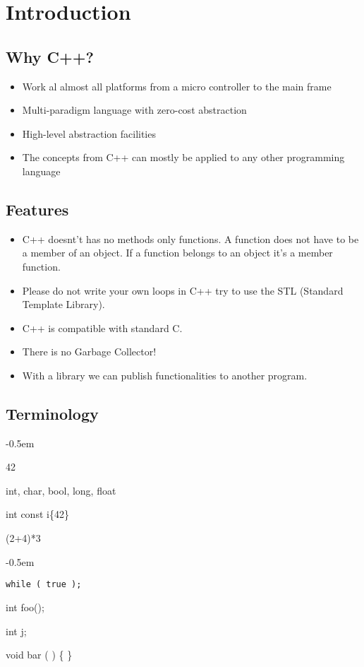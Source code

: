 \tableofcontents
\pagebreak

\section{Introduction}
\subsection{Why C++?}
\begin{itemize}
  \itemsep -0.5em 
  \item Work al almost all platforms from a micro controller to the main frame
  \item Multi-paradigm language with zero-cost abstraction
  \item High-level abstraction facilities
  \item The concepts from C++ can mostly be applied to any other programming language
\end{itemize}

\subsection{Features}
\begin{itemize}
  \itemsep -0.5em 
  \item C++ doesnt't has no methods only functions. A function does not have to be a member of an object. If a function belongs to an object it's a member function.
  \item Please do not write your own loops in C++ try to use the STL (Standard Template Library).
  \item C++ is compatible with standard C.
  \item There is no Garbage Collector!
  \item With a library we can publish functionalities to another program.
\end{itemize}

\subsection{Terminology}
\begin{minipage}{0,5\linewidth}
	\begin{description}
		\itemsep -0.5em
		\item[Value] 42
  		\item[Type] int, char, bool, long, float
  		\item[Variable] int const i\{42\}
  		\item[Expression] (2+4)*3
	\end{description}  
\end{minipage}
\begin{minipage}{0,5\linewidth}
	\begin{description}
		\itemsep -0.5em
   		\item[Statement] \lstinline|while ( true );|
  		\item[Declaration] int foo();
  		\item [Definition] int j;
  		\item [Function] void bar ( ) \{ \}
	\end{description}  
\end{minipage}

